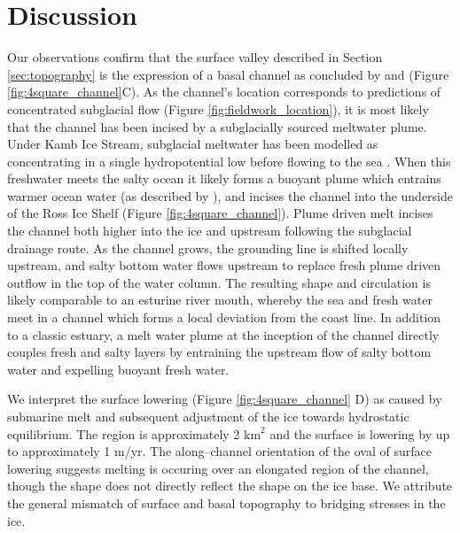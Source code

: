 \newpage

\section{Discussion} \label{sec:discussion}


\label{sec:meltwater}

Our observations confirm that the surface valley described in Section \ref{sec:topography} is the expression of a basal channel as concluded by \cite{kim2016active} and \cite{alley2016impacts} (Figure \ref{fig:4square_channel}C). 
As the channel's location corresponds to predictions of concentrated subglacial flow (Figure \ref{fig:fieldwork_location}), it is most likely that the channel has been incised by a subglacially sourced meltwater plume. Under Kamb Ice Stream, subglacial meltwater has been modelled as concentrating in a single hydropotential low before flowing to the sea \citep{carter2012supply, le2013evidence}. When this freshwater meets the salty ocean it likely forms a buoyant plume which entrains warmer ocean water (as described by \cite{sergienko2013basal}), and incises the channel into the underside of the Ross Ice Shelf (Figure \ref{fig:4square_channel}). Plume driven melt incises the channel both higher into the ice and upstream following the subglacial drainage route. As the channel grows, the grounding line is shifted locally upstream, and salty bottom water flows upstream to replace fresh plume driven outflow in the top of the water column. The resulting shape and circulation is likely comparable to an esturine river mouth, whereby the sea and fresh water meet in a channel which forms a local deviation from the coast line. In addition to a classic estuary, a melt water plume at the inception of the channel directly couples fresh and salty layers by entraining the upstream flow of salty bottom water and expelling buoyant fresh water. 



\label{sec:surface_lowering}
We interpret the surface lowering (Figure \ref{fig:4square_channel} D) as caused by submarine melt and subsequent adjustment of the ice towards hydrostatic equilibrium. The region is approximately 2 $\mathrm{km}^2$ and the surface is lowering by up to approximately 1 m/yr. The along--channel orientation of the oval of surface lowering suggests melting is occuring over an elongated region of the channel, though the shape does not directly reflect the shape on the ice base. We attribute the general mismatch of surface and basal topography to bridging stresses in the ice.

